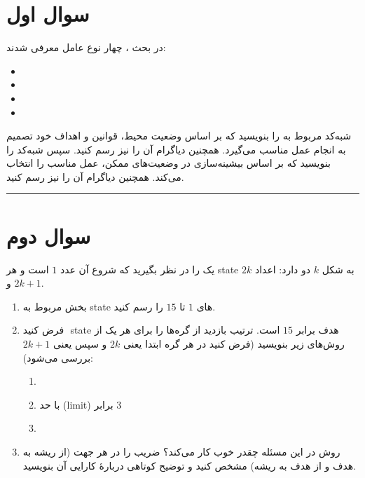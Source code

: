 \documentclass[a4paper,10pt]{article}
\begin{document}


\section{سوال اول}
در بحث ، چهار نوع عامل معرفی شدند:
\begin{itemize}
    \item {}
    \item {}
    \item {}
    \item {}
\end{itemize}
\noindent
شبه‌کد مربوط به  را بنویسید که بر اساس وضعیت محیط، قوانین و اهداف خود تصمیم به انجام عمل مناسب می‌گیرد. 
همچنین دیاگرام آن را نیز رسم کنید.  
سپس شبه‌کد  را بنویسید که بر اساس بیشینه‌سازی   در وضعیت‌های ممکن، عمل مناسب را انتخاب می‌کند. 
همچنین دیاگرام آن را نیز رسم کنید.  
\bigskip
\bigskip
\hline
\rule{\linewidth}{0.4pt}

\section{سوال دوم}
یک  را در نظر بگیرید که  شروع آن عدد \(1\) است  و هر state به شکل \(k\) دو  دارد: اعداد \(2k\) و \(2k+1\).

\begin{enumerate}
    \item بخش مربوط به state های \(1\) تا \(15\) را رسم کنید.
    \item فرض کنید \(\)  state هدف برابر \(15\) است. ترتیب بازدید از گره‌ها را برای هر یک از روش‌های زیر بنویسید (فرض کنید در هر گره ابتدا  یعنی \(2k\) و سپس  یعنی \(2k+1\) بررسی می‌شود):
    \begin{enumerate}
        \item {}
        \item {} با حد (limit) برابر \(3\)
        \item {}
    \end{enumerate}
    \item روش  در این مسئله چقدر خوب کار می‌کند؟ ضریب  را در هر جهت (از ریشه به هدف و از هدف به ریشه) مشخص کنید و توضیح کوتاهی دربارهٔ کارایی آن بنویسید.
\end{enumerate}
\bigskip
\end{document}
